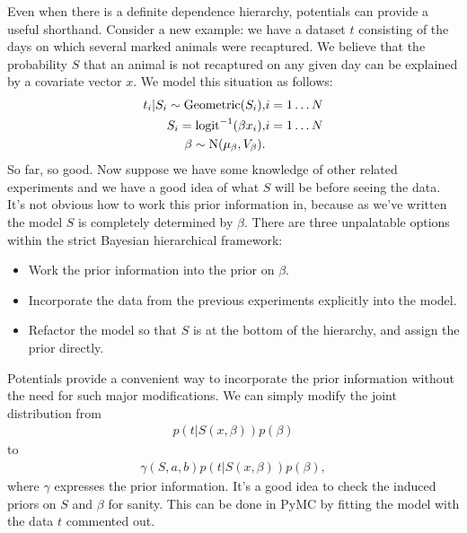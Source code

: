 Even when there is a definite dependence hierarchy, potentials can provide a useful shorthand. Consider a new example: we have a dataset $t$ consisting of the days on which several marked animals were recaptured. We believe that the probability $S$ that an animal is not recaptured on any given day can be explained by a covariate vector $x$. We model this situation as follows:
\begin{eqnarray*}
    t_i|S_i \sim \textup{Geometric}(S_i), & i=1\ldots N\\
    S_i = \textup{logit}^{-1}(\beta x_i), &i=1\ldots N\\
    \beta\sim \textup{N}(\mu_\beta, V_\beta).
\end{eqnarray*}
So far, so good. Now suppose we have some knowledge of other related experiments and we have a good idea of what $S$ will be before seeing the data. It's not obvious how to work this prior information in, because as we've written the model $S$ is completely determined by $\beta$. There are three unpalatable options within the strict Bayesian hierarchical framework:
\begin{itemize}
    \item Work the prior information into the prior on $\beta$.
    \item Incorporate the data from the previous experiments explicitly into the model.
    \item Refactor the model so that $S$ is at the bottom of the hierarchy, and assign the prior directly.
\end{itemize}

Potentials provide a convenient way to incorporate the prior information without the need for such major modifications. We can simply modify the joint distribution from
\begin{eqnarray*}
    p(t|S(x,\beta)) p(\beta)
\end{eqnarray*}
to
\begin{eqnarray*}
    \gamma(S,a,b) p(t|S(x,\beta)) p(\beta),
\end{eqnarray*}
where $\gamma$ expresses the prior information. It's a good idea to check the induced priors on $S$ and $\beta$ for sanity. This can be done in PyMC by fitting the model with the data $t$ commented out.

